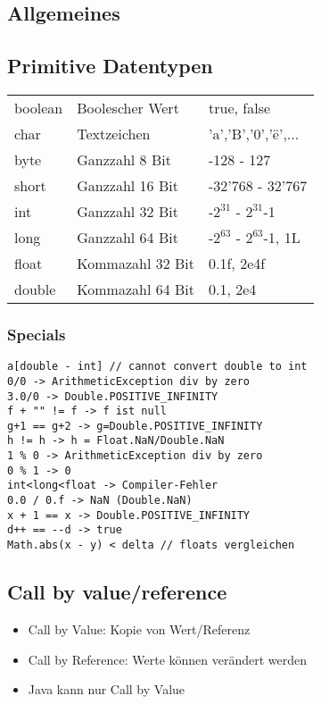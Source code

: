 

\newcommand{\SUBJECT}{}
\newcommand{\TITLE}{Cheat Sheet Objektorientierte Programmierung}



% 

\begin{multicols*}{5}
    \setlength{\columnseprule}{0.4pt}
		\footnotesize
		
% 

\section{Allgemeines}
	\subsection{Primitive Datentypen}
		\begin{tabular}{p{.7cm} | p{2.1cm} | l}
			boolean&Boolescher Wert&true, false\\
			char&Textzeichen&'a','B','0','ë',...\\
			byte&Ganzzahl 8 Bit&-128 - 127\\
			short&Ganzzahl 16 Bit&-32'768 - 32'767\\
			int&Ganzzahl 32 Bit&-$2^{31}$ - $2^{31}$-1\\
			long&Ganzzahl 64 Bit&-$2^{63}$ - $2^{63}$-1, 1L\\
			float&Kommazahl 32 Bit&0.1f, 2e4f\\
			double&Kommazahl 64 Bit&0.1, 2e4\\
		\end{tabular}
		\subsubsection{Specials}
		\begin{lstlisting}
a[double - int] // cannot convert double to int
0/0 -> ArithmeticException div by zero
3.0/0 -> Double.POSITIVE_INFINITY
f + "" != f -> f ist null
g+1 == g+2 -> g=Double.POSITIVE_INFINITY
h != h -> h = Float.NaN/Double.NaN
1 % 0 -> ArithmeticException div by zero
0 % 1 -> 0
int<long<float -> Compiler-Fehler
0.0 / 0.f -> NaN (Double.NaN)
x + 1 == x -> Double.POSITIVE_INFINITY
d++ == --d -> true
Math.abs(x - y) < delta // floats vergleichen
		\end{lstlisting}

	\subsection{Call by value/reference}
		\begin{itemize}
			\item Call by Value: Kopie von Wert/Referenz
			\item Call by Reference: Werte können verändert werden
			\item Java kann nur Call by Value
		\end{itemize}
	

\end{multicols*}
